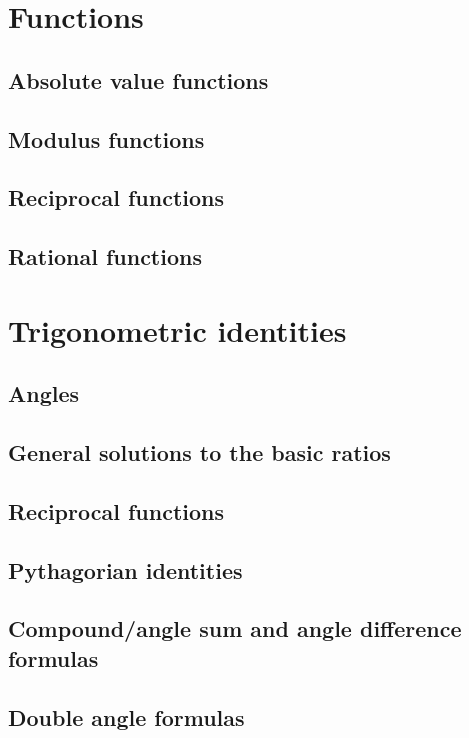 \documentclass{book}
\begin{document}
\chapter{Functions}
\section{Absolute value functions}

\section{Modulus functions}

\section{Reciprocal functions}

\section{Rational functions}

\chapter{Trigonometric identities}
\section{Angles}

\section{General solutions to the basic ratios}

\section{Reciprocal functions}

\section{Pythagorian identities}

\section{Compound/angle sum and angle difference formulas}

\section{Double angle formulas}
\end{document}
